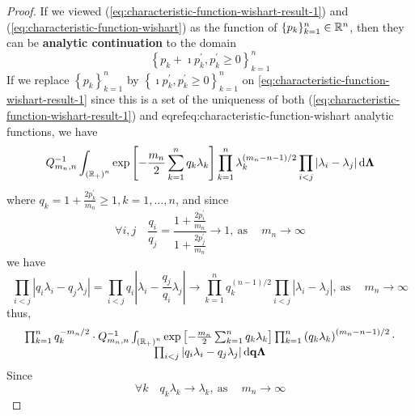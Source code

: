 \begin{proof}
	If we viewed (\ref{eq:characteristic-function-wishart-result-1}) and (\ref{eq:characteristic-function-wishart}) as the function of $\{p_{k}\}_{k=1}^{n}\in{\mathbb R}^{n}$, then they can be \textbf{analytic continuation} to the domain
	\begin{equation*}
		\left\{p_{k}+\imath p_{k}^{\prime},p_{k}^{\prime}\geq 0\right\}_{k=1}^{n}
	\end{equation*}
	If we replace $\left\{p_{k}\right\}_{k=1}^{n}$ by $\left\{\imath p_{k}^{\prime},p_{k}^{\prime}\geq 0\right\}_{k=1}^{n}$ on \eqref{eq:characteristic-function-wishart-result-1} since this is a set of the uniqueness of both (\ref{eq:characteristic-function-wishart-result-1}) and eqref{eq:characteristic-function-wishart} analytic functions, we have
	\begin{equation*}
		Q_{m_{n},n}^{-1}\int_{\left({\mathbb R}_{+}\right)^{n}}\exp\left[-\frac{m_{n}}{2}\sum_{k=1}^{n}q_{k}\lambda_{k}\right]\prod_{k=1}^{n}\lambda_{k}^{(m_{n}-n-1)/2}\prod_{i<j}\left|\lambda_{i}-\lambda_{j}\right|\mathop{}\!\mathrm{d}\boldsymbol{\Lambda}
	\end{equation*}
	where $q_{k}=1+\frac{2p_{k}^{\prime}}{m_{n}}\geq 1,k=1,\ldots,n$, and since
	\begin{equation*}
		\forall i,j\quad\frac{q_{i}}{q_{j}}=\frac{1+\frac{2p_{i}^{\prime}}{m_{n}}}{1+\frac{2p_{j}^{\prime}}{m_{n}}}\rightarrow 1,\ \text{as}\ \quad m_{n}\rightarrow\infty
	\end{equation*}
	we have
	\begin{equation*}
		\prod_{i<j}\left|q_{i}\lambda_{i}-q_{j}\lambda_{j}\right|=\prod_{i<j}q_{i}\left|\lambda_{i}-\frac{q_{j}}{q_{i}}\lambda_{j}\right|\rightarrow\prod_{k=1}^{n}q_{k}^{(n-1)/2}\prod_{i<j}\left|\lambda_{i}-\lambda_{j}\right|,\ \text{as}\ \quad m_{n}\rightarrow\infty
	\end{equation*}
	thus,
	\begin{equation*}
		\begin{array}{c}
			\prod_{k=1}^{n}q_{k}^{-m_{n}/2}\cdot Q_{m_{n},n}^{-1}\int_{\left({\mathbb R}_{+}\right)^{n}}\exp\left[-\frac{m_{n}}{2}\sum_{k=1}^{n}q_{k}\lambda_{k}\right]\prod_{k=1}^{n}\left(q_{k}\lambda_{k}\right)^{(m_{n}-n-1)/2}\cdot \\
			\prod_{i<j}\left|q_{i}\lambda_{i}-q_{j}\lambda_{j}\right|\mathop{}\!\mathrm{d}{\bf q}\boldsymbol{\Lambda}
		\end{array}
	\end{equation*}
	Since
	\begin{equation*}
		\forall k\quad q_{k}\lambda_{k}\rightarrow\lambda_{k},\ \text{as}\ \quad m_{n}\rightarrow\infty
	\end{equation*}

\end{proof}
